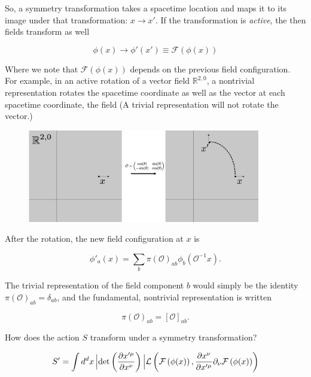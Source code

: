 \noindent So, a symmetry transformation takes a spacetime location and maps it to its image under that transformation: $x \rightarrow x'$. If the transformation is \textit{active}, the then fields transform as well

\begin{equation}
\phi (x) \rightarrow \phi' (x') \equiv \mathcal{F}(\phi(x))
\end{equation}

\noindent Where we note that $\mathcal{F}(\phi(x))$ depends on the previous field configuration. \\

\noindent For example, in an active rotation of a vector field $\mathbb{R}^{2,0}$, a nontrivial representation rotates the spacetime coordinate as well as the vector at each spacetime coordinate, the field (A trivial representation will not rotate the vector.)

\begin{figure}[H]
	\centering
	\includegraphics[width=4in]{images/active_rotation.png} 
\end{figure} 

\noindent After the rotation, the new field configuration at $x$ is

\begin{equation}
\phi'_a (x) = \sum_b \pi (\mathcal{O})_{ab} \phi_b (\mathcal{O}^{-1} x).
\end{equation}

\noindent The trivial representation of the field component $b$ would simply be the identity $\pi(\mathcal{O})_{ab} = \delta_{ab}$, and the fundamental, nontrivial representation is written

\begin{equation}
\pi (\mathcal{O})_{ab} = [ \mathcal{O} ] _{ab}.
\end{equation}

\noindent How does the action $S$ transform under a symmetry transformation?

\begin{equation}
S' = \int d^d x \, \Big{|} \text{det} \left( \frac{\partial x'^\mu}{\partial x^\nu} \right) \Big{|} \mathcal{L} \left( \mathcal{F} \left( \phi (x) \right), \frac{\partial x^\nu}{\partial x'^{\mu}} \partial_\nu \mathcal{F} \left( \phi (x) \right) \right)
\end{equation}

